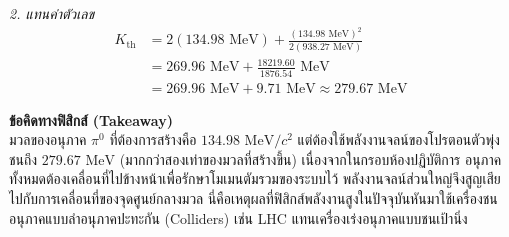 \begin{psctexample}
\textit{2. แทนค่าตัวเลข}
\begin{align}
K_{\text{th}} &= 2 (134.98\text{ MeV}) + \frac{(134.98\text{ MeV})^2}{2 (938.27\text{ MeV})} \nonumber \\
&= 269.96\text{ MeV} + \frac{18219.60}{1876.54}\text{ MeV} \nonumber \\
&= 269.96\text{ MeV} + 9.71\text{ MeV} \approx 279.67\text{ MeV}
\end{align}

\textbf{ข้อคิดทางฟิสิกส์ (Takeaway)} \\
มวลของอนุภาค $\pi^0$ ที่ต้องการสร้างคือ $134.98\text{ MeV}/c^2$ แต่ต้องใช้พลังงานจลน์ของโปรตอนตัวพุ่งชนถึง $279.67\text{ MeV}$ (มากกว่าสองเท่าของมวลที่สร้างขึ้น) เนื่องจากในกรอบห้องปฏิบัติการ อนุภาคทั้งหมดต้องเคลื่อนที่ไปข้างหน้าเพื่อรักษาโมเมนตัมรวมของระบบไว้ พลังงานจลน์ส่วนใหญ่จึงสูญเสียไปกับการเคลื่อนที่ของจุดศูนย์กลางมวล นี่คือเหตุผลที่ฟิสิกส์พลังงานสูงในปัจจุบันหันมาใช้เครื่องชนอนุภาคแบบลำอนุภาคปะทะกัน (Colliders) เช่น LHC แทนเครื่องเร่งอนุภาคแบบชนเป้านิ่ง
\qedexam
\end{psctexample}

